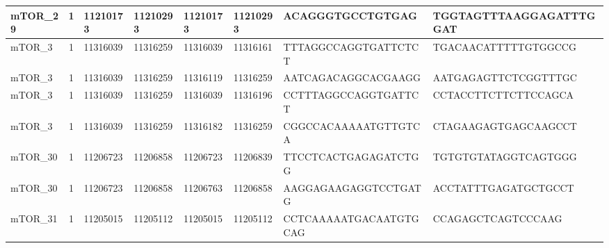 \begin{landscape}
\begin{longtable}{| p{} | p{} | p{} | p{} | p{} | p{} | p{} | p{} |}
\multicolumn{1}{|l|}{mTOR\_29}   & \multicolumn{1}{c|}{1}  & \multicolumn{1}{l|}{11210173}  & \multicolumn{1}{l|}{11210293}  & \multicolumn{1}{l|}{11210173}  & \multicolumn{1}{l|}{11210293}  & \multicolumn{1}{l|}{ACAGGGTGCCTGTGAG}                & \multicolumn{1}{l|}{TGGTAGTTTAAGGAGATTTGGAT}       \\ \hline
\multicolumn{1}{|l|}{mTOR\_3}    & \multicolumn{1}{c|}{1}  & \multicolumn{1}{l|}{11316039}  & \multicolumn{1}{l|}{11316259}  & \multicolumn{1}{l|}{11316039}  & \multicolumn{1}{l|}{11316161}  & \multicolumn{1}{l|}{TTTAGGCCAGGTGATTCTCT}            & \multicolumn{1}{l|}{TGACAACATTTTTGTGGCCG}          \\ \hline
\multicolumn{1}{|l|}{mTOR\_3}    & \multicolumn{1}{c|}{1}  & \multicolumn{1}{l|}{11316039}  & \multicolumn{1}{l|}{11316259}  & \multicolumn{1}{l|}{11316119}  & \multicolumn{1}{l|}{11316259}  & \multicolumn{1}{l|}{AATCAGACAGGCACGAAGG}             & \multicolumn{1}{l|}{AATGAGAGTTCTCGGTTTGC}          \\ \hline
\multicolumn{1}{|l|}{mTOR\_3}    & \multicolumn{1}{c|}{1}  & \multicolumn{1}{l|}{11316039}  & \multicolumn{1}{l|}{11316259}  & \multicolumn{1}{l|}{11316039}  & \multicolumn{1}{l|}{11316196}  & \multicolumn{1}{l|}{CCTTTAGGCCAGGTGATTCT}            & \multicolumn{1}{l|}{CCTACCTTCTTCTTCCAGCA}          \\ \hline
\multicolumn{1}{|l|}{mTOR\_3}    & \multicolumn{1}{c|}{1}  & \multicolumn{1}{l|}{11316039}  & \multicolumn{1}{l|}{11316259}  & \multicolumn{1}{l|}{11316182}  & \multicolumn{1}{l|}{11316259}  & \multicolumn{1}{l|}{CGGCCACAAAAATGTTGTCA}            & \multicolumn{1}{l|}{CTAGAAGAGTGAGCAAGCCT}          \\ \hline
\multicolumn{1}{|l|}{mTOR\_30}   & \multicolumn{1}{c|}{1}  & \multicolumn{1}{l|}{11206723}  & \multicolumn{1}{l|}{11206858}  & \multicolumn{1}{l|}{11206723}  & \multicolumn{1}{l|}{11206839}  & \multicolumn{1}{l|}{TTCCTCACTGAGAGATCTGG}            & \multicolumn{1}{l|}{TGTGTGTATAGGTCAGTGGG}          \\ \hline
\multicolumn{1}{|l|}{mTOR\_30}   & \multicolumn{1}{c|}{1}  & \multicolumn{1}{l|}{11206723}  & \multicolumn{1}{l|}{11206858}  & \multicolumn{1}{l|}{11206763}  & \multicolumn{1}{l|}{11206858}  & \multicolumn{1}{l|}{AAGGAGAAGAGGTCCTGATG}            & \multicolumn{1}{l|}{ACCTATTTGAGATGCTGCCT}          \\ \hline
\multicolumn{1}{|l|}{mTOR\_31}   & \multicolumn{1}{c|}{1}  & \multicolumn{1}{l|}{11205015}  & \multicolumn{1}{l|}{11205112}  & \multicolumn{1}{l|}{11205015}  & \multicolumn{1}{l|}{11205112}  & \multicolumn{1}{l|}{CCTCAAAAATGACAATGTGCAG}          & \multicolumn{1}{l|}{CCAGAGCTCAGTCCCAAG}            \\ \hline

\end{longtable}
\end{landscape}
